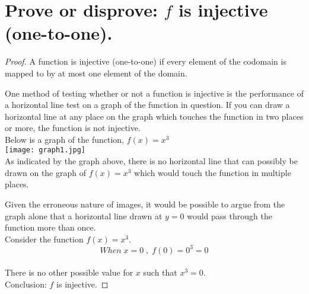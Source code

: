 \documentclass{article}
\begin{document}
\section{Prove or disprove: $f$ is injective (one-to-one).}
\begin{proof} 

A function is injective (one-to-one) if every element of the codomain is mapped to by at most one element of the domain. 

One method of testing whether or not a function is injective is the performance of a horizontal line test on a graph of the function in question. If you can draw a horizontal line at any place on the graph which touches the function in two places or more, the function is not injective. \\

Below is a graph of the function, $f(x) = x^3$ \\

\hfill\texttt{[image: graph1.jpg]}\hspace*{\fill} \\

As indicated by the graph above, there is no horizontal line that can possibly be drawn on the graph of $f(x) = x^3$ which would touch the function in multiple places.

Given the erroneous nature of images, it would be possible to argue from the graph alone that a horizontal line drawn at $y = 0$ would pass through the function more than once. \\

Consider the function $f(x) = x^3$. \\
\begin{equation}
When \; x = 0 \; , \; f(0) = 0^3 = 0
\end{equation} \\

There is no other possible value for $x$ such that $x^3 = 0$.\\

Conclusion: $f$ is injective.

\end{proof}
\end{document}
